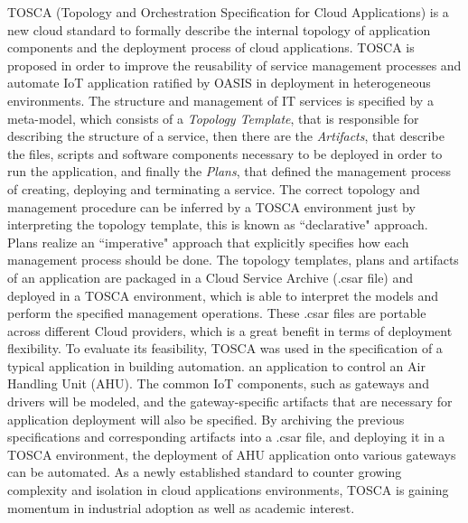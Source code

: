 TOSCA (Topology and Orchestration Specification for Cloud Applications) \cite{li2013towards} is a new
cloud standard to formally describe the internal topology of application components and the deployment
process of cloud applications. TOSCA is proposed in order to improve the reusability of service management
processes and automate IoT application ratified by OASIS in deployment in heterogeneous environments.
The structure and management of IT services is specified by a meta-model, which consists of
a \textit{Topology Template}, that is responsible for describing the structure of a service, then there
are the \textit{Artifacts}, that describe the files, scripts and software components necessary to be
deployed in order to run the application, and finally the \textit{Plans}, that defined the management process
of creating, deploying and terminating a service. The correct topology and management procedure can be inferred
by a TOSCA environment just by interpreting the topology template, this is known as ``declarative" approach.
Plans realize an ``imperative" approach that explicitly specifies how each management process should be done.
The topology templates, plans and artifacts of an application are packaged in a Cloud Service Archive (.csar file)
and deployed in a TOSCA environment, which is able to interpret the models and perform the specified management
operations. These .csar files are portable across different Cloud providers, which is a great benefit in terms
of deployment flexibility. To evaluate its feasibility, TOSCA was used in the specification of a typical
application in building automation. an application to control an Air Handling Unit (AHU). The common IoT
components, such as gateways and drivers will be modeled, and the gateway-specific artifacts that are
necessary for application deployment will also be specified. By archiving the previous specifications
and corresponding artifacts into a .csar file, and deploying it in a TOSCA environment, the deployment
of AHU application onto various gateways can be automated. As a newly established standard to counter
growing complexity and isolation in cloud applications environments, TOSCA is gaining momentum in industrial
adoption as well as academic interest.
